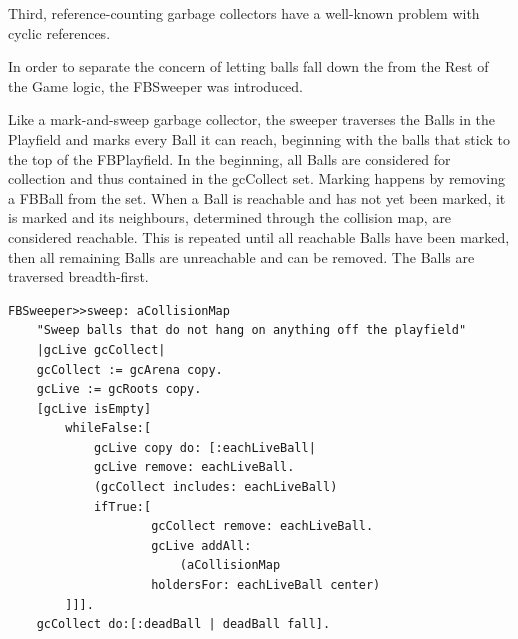 Third, reference-counting garbage collectors have a well-known problem with cyclic references.

In order to separate the concern of letting balls fall down the from the Rest of the Game logic, the FBSweeper was introduced.

Like a mark-and-sweep garbage collector, the sweeper traverses the Balls in the Playfield and marks every Ball it can reach, beginning with the balls that stick to the top of the FBPlayfield.  In the beginning, all Balls are considered for collection and thus contained in the gcCollect set. Marking happens by removing a FBBall from the set. When a Ball is reachable and has not yet been marked, it is marked and its neighbours, determined through the collision map, are considered reachable. This is repeated until all reachable Balls have been marked, then all remaining Balls are unreachable and can be removed.
The Balls are traversed breadth-first.
%
\begin{lstlisting}[language=Smalltalk, label=lst:sweep, caption=Mark-and-Sweep Ball Collector, float]
FBSweeper>>sweep: aCollisionMap
    "Sweep balls that do not hang on anything off the playfield"
    |gcLive gcCollect|
    gcCollect := gcArena copy.
    gcLive := gcRoots copy.
    [gcLive isEmpty] 
        whileFalse:[
            gcLive copy do: [:eachLiveBall|
            gcLive remove: eachLiveBall.
            (gcCollect includes: eachLiveBall) 
	        ifTrue:[
                    gcCollect remove: eachLiveBall.
                    gcLive addAll:
                        (aCollisionMap 
		            holdersFor: eachLiveBall center)
        ]]].
    gcCollect do:[:deadBall | deadBall fall].
\end{lstlisting}
%
